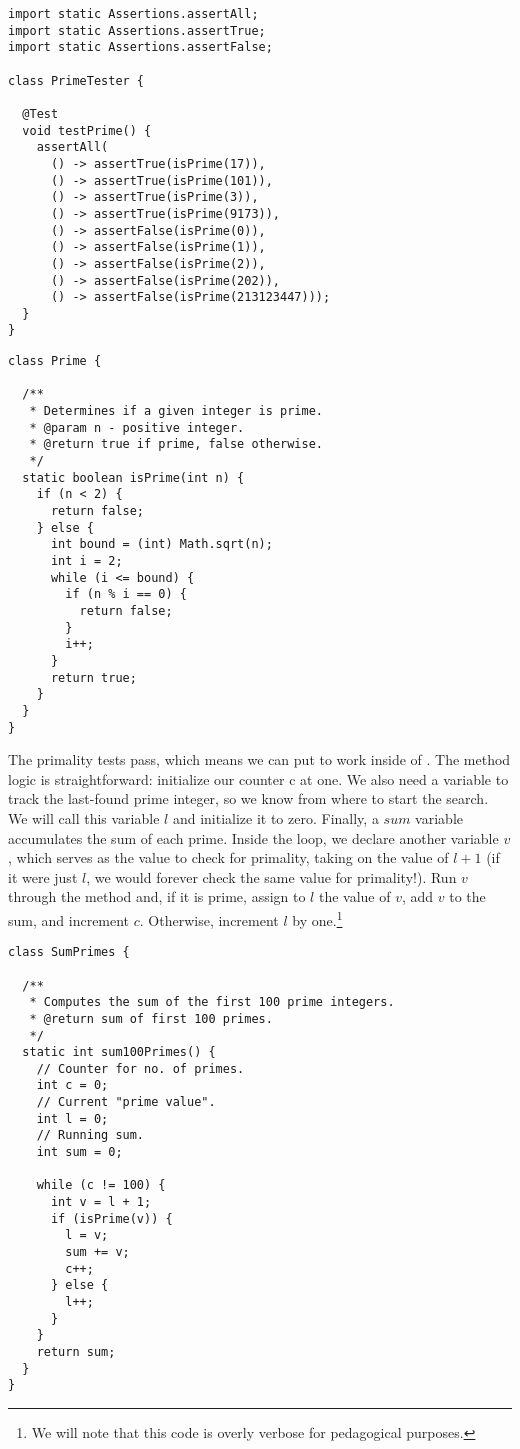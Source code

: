 \begin{lstlisting}[language=MyJava]
import static Assertions.assertAll;
import static Assertions.assertTrue;
import static Assertions.assertFalse;

class PrimeTester {

  @Test
  void testPrime() {
    assertAll(
      () -> assertTrue(isPrime(17)),
      () -> assertTrue(isPrime(101)),
      () -> assertTrue(isPrime(3)),
      () -> assertTrue(isPrime(9173)),
      () -> assertFalse(isPrime(0)),
      () -> assertFalse(isPrime(1)),
      () -> assertFalse(isPrime(2)),
      () -> assertFalse(isPrime(202)),
      () -> assertFalse(isPrime(213123447)));
  }
}
\end{lstlisting}


\begin{lstlisting}[language=MyJava]
class Prime {

  /**
   * Determines if a given integer is prime.
   * @param n - positive integer.
   * @return true if prime, false otherwise.
   */
  static boolean isPrime(int n) {
    if (n < 2) { 
      return false;
    } else {
      int bound = (int) Math.sqrt(n);
      int i = 2;
      while (i <= bound) {
        if (n % i == 0) {
          return false;
        }
        i++;
      }
      return true;
    }
  }
}
\end{lstlisting}

The primality tests pass, which means we can put  to work inside of . The method logic is straightforward: initialize our counter c at one. We also need a variable to track the last-found prime integer, so we know from where to start the search. We will call this variable $l$ and initialize it to zero. Finally, a $\mathit{sum}$ variable accumulates the sum of each prime. Inside the loop, we declare another variable $v$, which serves as the value to check for primality, taking on the value of $l + 1$ (if it were just $l$, we would forever check the same value for primality!). Run $v$ through the  method and, if it is prime, assign to $l$ the value of $v$, add $v$ to the sum, and increment $c$. Otherwise, increment $l$ by one.\footnote{We will note that this code is overly verbose for pedagogical purposes.}

\begin{lstlisting}[language=MyJava]
class SumPrimes {

  /**
   * Computes the sum of the first 100 prime integers.
   * @return sum of first 100 primes.
   */
  static int sum100Primes() {
    // Counter for no. of primes.
    int c = 0;   
    // Current "prime value".
    int l = 0;   
    // Running sum.
    int sum = 0; 
    
    while (c != 100) {
      int v = l + 1;
      if (isPrime(v)) {
        l = v;
        sum += v;
        c++;
      } else {
        l++;
      }
    }
    return sum;
  }
}
\end{lstlisting}

